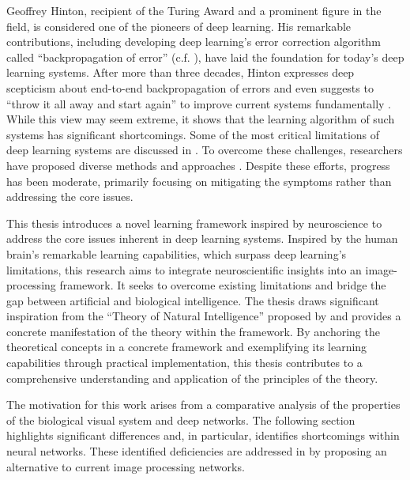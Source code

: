Geoffrey Hinton, recipient of the Turing Award and a prominent figure in the field, is considered one of the pioneers of deep learning.
His remarkable contributions, including developing deep learning's error correction algorithm called ``backpropagation of error'' (c.f. ), have laid the foundation for today's deep learning systems.
After more than three decades, Hinton expresses deep scepticism about end-to-end backpropagation of errors and even suggests to ``throw it all away and start again'' to improve current systems fundamentally \cite{axios_hinton}.
While this view may seem extreme, it shows that the learning algorithm of such systems has significant shortcomings.
Some of the most critical limitations of deep learning systems are discussed in .
To overcome these challenges, researchers have proposed diverse methods and approaches \cite{long_survey_2022, sager_unsupervised_2022, yarats_improving_2021}. Despite these efforts, progress has been moderate, primarily focusing on mitigating the symptoms rather than addressing the core issues.

This thesis introduces a novel learning framework inspired by neuroscience to address the core issues inherent in deep learning systems. Inspired by the human brain's remarkable learning capabilities, which surpass deep learning's limitations, this research aims to integrate neuroscientific insights into an image-processing framework. It seeks to overcome existing limitations and bridge the gap between artificial and biological intelligence. The thesis draws significant inspiration from the ``Theory of Natural Intelligence'' proposed by   \citeauthor*{von_der_malsburg_theory_2022} \citeauthor{von_der_malsburg_theory_2022} and provides a concrete manifestation of the theory within the framework. By anchoring the theoretical concepts in a concrete framework and exemplifying its learning capabilities through practical implementation, this thesis contributes to a comprehensive understanding and application of the principles of the theory.


The motivation for this work arises from a comparative analysis of the properties of the biological visual system and deep networks. The following section highlights significant differences and, in particular, identifies shortcomings within neural networks. These identified deficiencies are addressed in  by proposing an alternative to current image processing networks.


